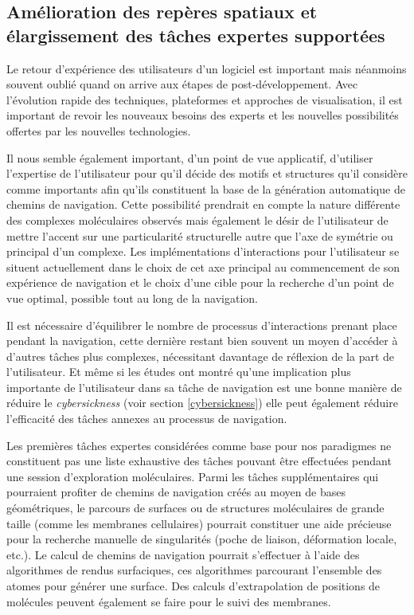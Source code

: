 \subsection*{Amélioration des repères spatiaux et élargissement des tâches expertes supportées}

Le retour d'expérience des utilisateurs d'un logiciel est important mais néanmoins souvent oublié quand on arrive aux étapes de post-développement. Avec l'évolution rapide des techniques, plateformes et approches de visualisation, il est important de revoir les nouveaux besoins des experts et les nouvelles possibilités offertes par les nouvelles technologies. 

Il nous semble également important, d'un point de vue applicatif, d'utiliser l'expertise de l'utilisateur pour qu'il décide des motifs et structures qu'il considère comme importants afin qu'ils constituent la base de la génération automatique de chemins de navigation. Cette possibilité prendrait en compte la nature différente des complexes moléculaires observés mais également le désir de l'utilisateur de mettre l'accent sur une particularité structurelle autre que l'axe de symétrie ou principal d'un complexe.
Les implémentations d'interactions pour l'utilisateur se situent actuellement dans le choix de cet axe principal au commencement de son expérience de navigation et le choix d'une cible pour la recherche d'un point de vue optimal, possible tout au long de la navigation. 

Il est nécessaire d'équilibrer le nombre de processus d'interactions prenant place pendant la navigation, cette dernière restant bien souvent un moyen d'accéder à d'autres tâches plus complexes, nécessitant davantage de réflexion de la part de l'utilisateur. Et même si les études ont montré qu'une implication plus importante de l'utilisateur dans sa tâche de navigation est une bonne manière de réduire le \textit{cybersickness} (voir section \ref{cybersickness}) elle peut également réduire l'efficacité des tâches annexes au processus de navigation.

Les premières tâches expertes considérées comme base pour nos paradigmes ne constituent pas une liste exhaustive des tâches pouvant être effectuées pendant une session d'exploration moléculaires. Parmi les tâches supplémentaires qui pourraient profiter de chemins de navigation créés au moyen de bases géométriques, le parcours de surfaces ou de structures moléculaires de grande taille (comme les membranes cellulaires) pourrait constituer une aide précieuse pour la recherche manuelle de singularités (poche de liaison, déformation locale, etc.). Le calcul de chemins de navigation pourrait s'effectuer à l'aide des algorithmes de rendus surfaciques, ces algorithmes parcourant l'ensemble des atomes pour générer une surface. Des calculs d'extrapolation de positions de molécules peuvent également se faire pour le suivi des membranes.

